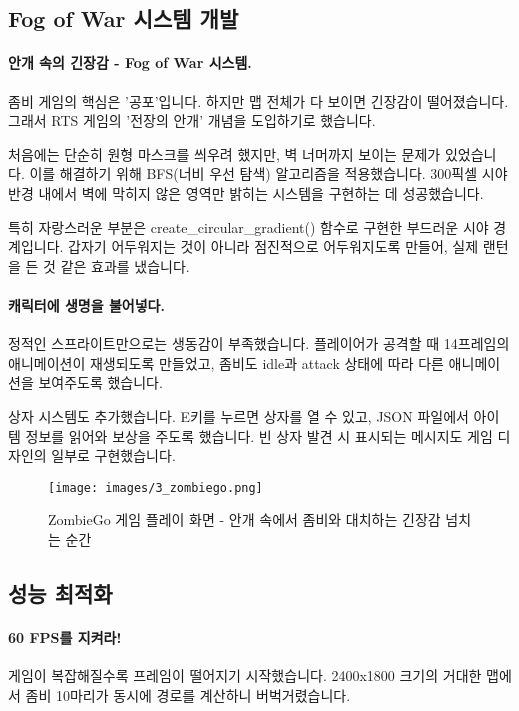 \subsection{Fog of War 시스템 개발}

\paragraph{안개 속의 긴장감 - Fog of War 시스템.}
좀비 게임의 핵심은 '공포'입니다. 하지만 맵 전체가 다 보이면 긴장감이 떨어졌습니다. 그래서 RTS 게임의 '전장의 안개' 개념을 도입하기로 했습니다.

처음에는 단순히 원형 마스크를 씌우려 했지만, 벽 너머까지 보이는 문제가 있었습니다. 이를 해결하기 위해 BFS(너비 우선 탐색) 알고리즘을 적용했습니다. 300픽셀 시야 반경 내에서 벽에 막히지 않은 영역만 밝히는 시스템을 구현하는 데 성공했습니다. 

특히 자랑스러운 부분은 create\_circular\_gradient() 함수로 구현한 부드러운 시야 경계입니다. 갑자기 어두워지는 것이 아니라 점진적으로 어두워지도록 만들어, 실제 랜턴을 든 것 같은 효과를 냈습니다.

\paragraph{캐릭터에 생명을 불어넣다.}
정적인 스프라이트만으로는 생동감이 부족했습니다. 플레이어가 공격할 때 14프레임의 애니메이션이 재생되도록 만들었고, 좀비도 idle과 attack 상태에 따라 다른 애니메이션을 보여주도록 했습니다. 

상자 시스템도 추가했습니다. E키를 누르면 상자를 열 수 있고, JSON 파일에서 아이템 정보를 읽어와 보상을 주도록 했습니다. 빈 상자 발견 시 표시되는 메시지도 게임 디자인의 일부로 구현했습니다.

\begin{figure}[h]
    \texttt{[image: images/3\_zombiego.png]}
    \caption{ZombieGo 게임 플레이 화면 - 안개 속에서 좀비와 대치하는 긴장감 넘치는 순간}
    \label{fig:zombiego}
\end{figure}

\subsection{성능 최적화}

\paragraph{60 FPS를 지켜라!}
게임이 복잡해질수록 프레임이 떨어지기 시작했습니다. 2400x1800 크기의 거대한 맵에서 좀비 10마리가 동시에 경로를 계산하니 버벅거렸습니다. 

